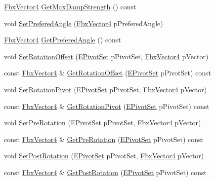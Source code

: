 \begin{DoxyCompactItemize}
\item 
\hyperlink{class_fbx_vector4}{Fbx\+Vector4} \hyperlink{class_fbx_node_a6290154866d9fdb5314457d58277fbbd}{Get\+Max\+Damp\+Strength} () const
\item 
void \hyperlink{class_fbx_node_ab818f1d02667c73d9610acc1ea4a7426}{Set\+Prefered\+Angle} (\hyperlink{class_fbx_vector4}{Fbx\+Vector4} p\+Prefered\+Angle)
\item 
\hyperlink{class_fbx_vector4}{Fbx\+Vector4} \hyperlink{class_fbx_node_a4f7c629e1004164f09a751432a442f74}{Get\+Prefered\+Angle} () const
\item 
void \hyperlink{class_fbx_node_adfb076b476353dde01ba411c487477bf}{Set\+Rotation\+Offset} (\hyperlink{class_fbx_node_ae62b7311ac4727654cdf1ebd5cbf7343}{E\+Pivot\+Set} p\+Pivot\+Set, \hyperlink{class_fbx_vector4}{Fbx\+Vector4} p\+Vector)
\item 
const \hyperlink{class_fbx_vector4}{Fbx\+Vector4} \& \hyperlink{class_fbx_node_ad234dda15a2a724fde3ecd723d5e8585}{Get\+Rotation\+Offset} (\hyperlink{class_fbx_node_ae62b7311ac4727654cdf1ebd5cbf7343}{E\+Pivot\+Set} p\+Pivot\+Set) const
\item 
void \hyperlink{class_fbx_node_aa03d51b621dd88e32c1209b3d4a0aa7d}{Set\+Rotation\+Pivot} (\hyperlink{class_fbx_node_ae62b7311ac4727654cdf1ebd5cbf7343}{E\+Pivot\+Set} p\+Pivot\+Set, \hyperlink{class_fbx_vector4}{Fbx\+Vector4} p\+Vector)
\item 
const \hyperlink{class_fbx_vector4}{Fbx\+Vector4} \& \hyperlink{class_fbx_node_ab0ca056f4773e45eeb10c8afe9d439bd}{Get\+Rotation\+Pivot} (\hyperlink{class_fbx_node_ae62b7311ac4727654cdf1ebd5cbf7343}{E\+Pivot\+Set} p\+Pivot\+Set) const
\item 
void \hyperlink{class_fbx_node_ac15a436bf09b95e030af68481606615e}{Set\+Pre\+Rotation} (\hyperlink{class_fbx_node_ae62b7311ac4727654cdf1ebd5cbf7343}{E\+Pivot\+Set} p\+Pivot\+Set, \hyperlink{class_fbx_vector4}{Fbx\+Vector4} p\+Vector)
\item 
const \hyperlink{class_fbx_vector4}{Fbx\+Vector4} \& \hyperlink{class_fbx_node_a73ab4581c4eccfe9b1cc56045102dc50}{Get\+Pre\+Rotation} (\hyperlink{class_fbx_node_ae62b7311ac4727654cdf1ebd5cbf7343}{E\+Pivot\+Set} p\+Pivot\+Set) const
\item 
void \hyperlink{class_fbx_node_ac40aa0ae2187a83a8195cb31e49df18e}{Set\+Post\+Rotation} (\hyperlink{class_fbx_node_ae62b7311ac4727654cdf1ebd5cbf7343}{E\+Pivot\+Set} p\+Pivot\+Set, \hyperlink{class_fbx_vector4}{Fbx\+Vector4} p\+Vector)
\item 
const \hyperlink{class_fbx_vector4}{Fbx\+Vector4} \& \hyperlink{class_fbx_node_a7a60a83de24636c96067cff6a79903f5}{Get\+Post\+Rotation} (\hyperlink{class_fbx_node_ae62b7311ac4727654cdf1ebd5cbf7343}{E\+Pivot\+Set} p\+Pivot\+Set) const

\end{DoxyCompactItemize}
